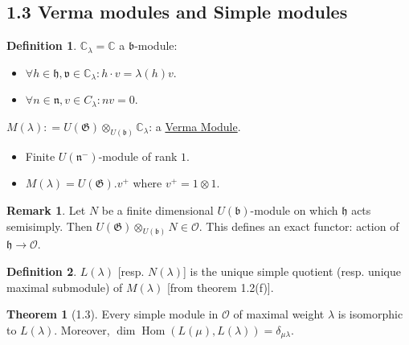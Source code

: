 \documentclass{article}
\theoremstyle{definition}
\newtheorem*{definition}{Definition}
\newtheorem{theorem}{Theorem}
\newtheorem*{remark}{Remark}
\begin{document}
    \subsection*{1.3 Verma modules and Simple modules}

    \begin{definition}
        \(\mathbb{C}_\lambda = \mathbb{C}\) a \(\mathfrak{b}\)-module:

        \begin{itemize}
            \item \(\forall h\in \mathfrak{h, v \in \mathbb{C}_\lambda}: h \cdot v = \lambda(h)v\).
            \item \(\forall n\in \mathfrak{n}, v \in C_\lambda: n v = 0\). 
        \end{itemize} 

        \(M(\lambda): = U(\mathfrak{G}) \otimes_{U(\mathfrak{b})} \mathbb{C}_\lambda\): a \underline{Verma Module}.
        
        \begin{itemize}
            \item Finite \(U(\mathfrak{n}^-)\)-module of rank \(1\).
            \item \(M(\lambda) = U(\mathfrak{G}).v^+\) where \(v^+ = 1 \otimes 1\).  
        \end{itemize} 
    \end{definition}

    \begin{remark}
        Let \(N\) be a finite dimensional \(U(\mathfrak{b})\)-module on which \(\mathfrak{h}\) acts semisimply. Then \(U(\mathfrak{G}) \otimes_{U(\mathfrak{b})} N \in \mathcal{O}\). This defines an exact functor: action of \(\mathfrak{h} \to \mathcal{O}\). 
    \end{remark}

    \begin{definition}
        \(L(\lambda)\) [resp. \(N(\lambda)\)] is the unique simple quotient (resp. unique maximal submodule) of \(M(\lambda)\) [from theorem 1.2(f)].
    \end{definition}

    \begin{theorem}
        [1.3] Every simple module in \(\mathcal{O}\) of maximal weight \(\lambda\) is isomorphic to \(L(\lambda)\). Moreover, \(\dim \operatorname{Hom}(L(\mu), L(\lambda)) = \delta_{\mu \lambda}\). 
    \end{theorem}
\end{document}
